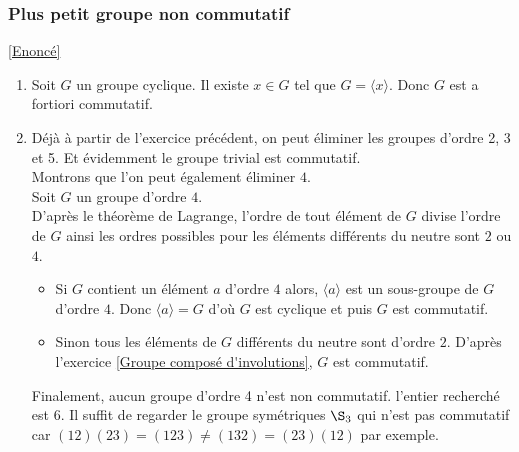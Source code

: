 \documentclass[8pt]{book}
\begin{document}
	\subsubsection{Plus petit groupe non commutatif }
	\label{Plus petit groupe non commutatif corrigé}
	\textcolor{blue}{\hyperref[Plus petit groupe non commutatif]{[Enoncé]}}
	\begin{enumerate}
		\item Soit $G$ un groupe cyclique. Il existe $x\in G$ tel que $G=\langle x \rangle$. Donc $G$ est a fortiori commutatif.
		\item Déjà à partir de l'exercice précédent, on peut éliminer les groupes d'ordre 2, 3 et 5. Et évidemment le groupe trivial est commutatif.\\
		Montrons que l'on peut également éliminer $4$.\\
		Soit $G$ un groupe d'ordre $4$.\\ 
		D'après le théorème de Lagrange, l'ordre de tout élément de $G$ divise l'ordre de $G$ ainsi les ordres possibles pour les éléments différents du neutre sont $2$ ou $4$.
		\begin{itemize}
			\item Si $G$ contient un élément $a$ d'ordre $4$ alors, $\langle a\rangle$ est un sous-groupe de $G$ d'ordre $4$. Donc $\langle a\rangle=G$ d'où $G$ est cyclique et puis $G$ est commutatif.
			\item Sinon tous les éléments de $G$ différents du neutre sont d'ordre $2$. D'après l'exercice \ref{Groupe composé d'involutions}, $G$ est commutatif.\\
		\end{itemize}
		Finalement, aucun groupe d'ordre 4 n'est non commutatif.
		l'entier recherché est 6. Il suffit de regarder le groupe symétriques $\S_3$ qui n'est pas commutatif car $(12)(23)=(123)\ne(132)=(23)(12)$ par exemple.	
	\end{enumerate}
	
\end{document}
